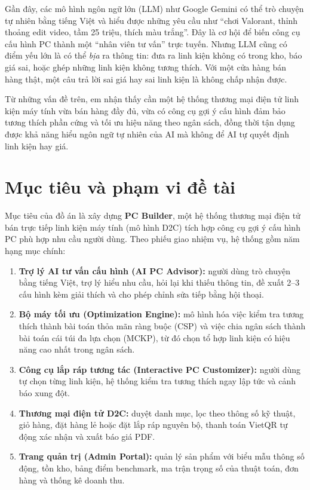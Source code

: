 Gần đây, các mô hình ngôn ngữ lớn (LLM) như Google Gemini có thể trò chuyện tự nhiên bằng tiếng Việt và hiểu được những yêu cầu như ``chơi Valorant, thỉnh thoảng edit video, tầm 25 triệu, thích màu trắng''. Đây là cơ hội để biến công cụ cấu hình PC thành một ``nhân viên tư vấn'' trực tuyến. Nhưng LLM cũng có điểm yếu lớn là có thể \emph{bịa} ra thông tin: đưa ra linh kiện không có trong kho, báo giá sai, hoặc ghép những linh kiện không tương thích. Với một cửa hàng bán hàng thật, một câu trả lời sai giá hay sai linh kiện là không chấp nhận được.

Từ những vấn đề trên, em nhận thấy cần một hệ thống thương mại điện tử linh kiện máy tính vừa bán hàng đầy đủ, vừa có công cụ gợi ý cấu hình đảm bảo tương thích phần cứng và tối ưu hiệu năng theo ngân sách, đồng thời tận dụng được khả năng hiểu ngôn ngữ tự nhiên của AI mà không để AI tự quyết định linh kiện hay giá.

\section{Mục tiêu và phạm vi đề tài}

Mục tiêu của đồ án là xây dựng \textbf{PC Builder}, một hệ thống thương mại điện tử bán trực tiếp linh kiện máy tính (mô hình D2C) tích hợp công cụ gợi ý cấu hình PC phù hợp nhu cầu người dùng. Theo phiếu giao nhiệm vụ, hệ thống gồm năm hạng mục chính:
\begin{enumerate}[label=(\roman*)]
  \item \textbf{Trợ lý AI tư vấn cấu hình (AI PC Advisor):} người dùng trò chuyện bằng tiếng Việt, trợ lý hiểu nhu cầu, hỏi lại khi thiếu thông tin, đề xuất 2--3 cấu hình kèm giải thích và cho phép chỉnh sửa tiếp bằng hội thoại.
  \item \textbf{Bộ máy tối ưu (Optimization Engine):} mô hình hóa việc kiểm tra tương thích thành bài toán thỏa mãn ràng buộc (CSP) và việc chia ngân sách thành bài toán cái túi đa lựa chọn (MCKP), từ đó chọn tổ hợp linh kiện có hiệu năng cao nhất trong ngân sách.
  \item \textbf{Công cụ lắp ráp tương tác (Interactive PC Customizer):} người dùng tự chọn từng linh kiện, hệ thống kiểm tra tương thích ngay lập tức và cảnh báo xung đột.
  \item \textbf{Thương mại điện tử D2C:} duyệt danh mục, lọc theo thông số kỹ thuật, giỏ hàng, đặt hàng lẻ hoặc đặt lắp ráp nguyên bộ, thanh toán VietQR tự động xác nhận và xuất báo giá PDF.
  \item \textbf{Trang quản trị (Admin Portal):} quản lý sản phẩm với biểu mẫu thông số động, tồn kho, bảng điểm benchmark, ma trận trọng số của thuật toán, đơn hàng và thống kê doanh thu.
\end{enumerate}

